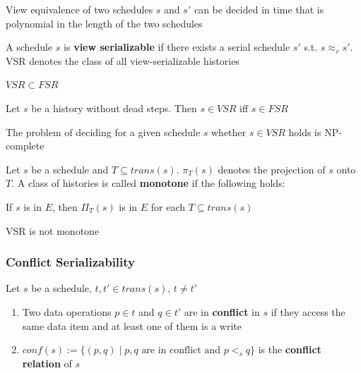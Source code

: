 \documentclass[11pt]{article}
\begin{document}
\begin{corollary}[]
View equivalence of two schedules \(s\) and \(s'\) can be decided in time that is polynomial in
the length of the two schedules
\end{corollary}

\begin{definition}[]
A schedule \(s\) is \textbf{view serializable} if there exists a serial schedule \(s'\)
s.t. \(s\approx_vs'\). VSR denotes the class of all view-serializable histories
\end{definition}

\begin{theorem}[]
\(VSR\subset FSR\)
\end{theorem}

\begin{theorem}[]
Let \(s\) be a history without dead steps. Then \(s\in VSR\) iff \(s\in FSR\)
\end{theorem}

\begin{theorem}[]
The problem of deciding for a given schedule \(s\) whether \(s\in VSR\) holds is NP-complete
\end{theorem}

\begin{definition}
Let \(s\) be a schedule and \(T\subseteq trans(s)\). \(\pi_T(s)\) denotes the projection
of \(s\) onto \(T\). A class of histories is called \textbf{monotone} if the following holds:
\begin{center}
If \(s\) is in \(E\), then \(\Pi_T(s)\) is in \(E\) for each \(T\subseteq trans(s)\)
\end{center}
\end{definition}

VSR is not monotone
\subsubsection{Conflict Serializability}
\label{sec:org806ffb7}
\begin{definition}
Let \(s\) be a schedule, \(t,t'\in trans(s)\), \(t\neq t'\)
\begin{enumerate}
\item Two data operations \(p\in t\) and \(q\in t'\) are in \textbf{conflict} in \(s\) if
they access the same data item and at least one of them is a write
\item \(conf(s):=\{(p,q)\mid p,q\text{ are in conflict and }p<_sq\}\) is the \textbf{conflict relation} of \(s\)
\end{enumerate}
\end{definition}
\end{document}
